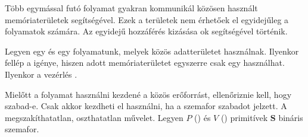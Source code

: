 \documentclass[main.tex]{subfiles}
\begin{document}
  Több egymással  futó folyamat gyakran
  kommunikál közösen használt memóriaterületek segítségével.
  Ezek a területek nem érhetőek el egyidejűleg a folyamatok
  számára. Az egyidejű hozzáférés kizásása ok
  segítségével történik.
  
  
  Legyen egy  és egy  folyamatunk,
  melyek közös adatterületet használnak. Ilyenkor fellép a
   igénye, hiszen adott memóriaterületet
  egyszerre csak egy  használhat. Ilyenkor a
  vezérlés .

  \begin{figure}[H]
    \centering
  \end{figure}
  
  Mielőtt a folyamat használni kezdené a közös erőforrást,
  ellenőriznie kell, hogy szabad-e. Csak akkor kezdheti el
  használni, ha a szemafor szabadot jelzett.
  A  megszakíthatatlan, oszthatatlan művelet.
  Legyen $P$ () és $V$ ()
  primitívek $\mathbf{S}$ bináris szemafor.
\end{document}

